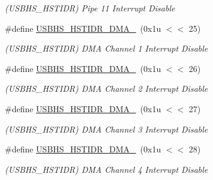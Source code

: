 \begin{DoxyCompactItemize}
\begin{DoxyCompactList}\small\item\em (U\+S\+B\+H\+S\+\_\+\+H\+S\+T\+I\+DR) Pipe 11 Interrupt Disable \end{DoxyCompactList}\item 
\mbox{\label{group__SAMV71__USBHS_ga093461bf7b81f1b606d9362880f396f1}} 
\#define \mbox{\hyperlink{group__SAMV71__USBHS_ga093461bf7b81f1b606d9362880f396f1}{U\+S\+B\+H\+S\+\_\+\+H\+S\+T\+I\+D\+R\+\_\+\+D\+M\+A\+\_}}~(0x1u $<$$<$ 25)
\begin{DoxyCompactList}\small\item\em (U\+S\+B\+H\+S\+\_\+\+H\+S\+T\+I\+DR) D\+MA Channel 1 Interrupt Disable \end{DoxyCompactList}\item 
\mbox{\label{group__SAMV71__USBHS_ga918da75c8395361aa6433e3f7f0d698d}} 
\#define \mbox{\hyperlink{group__SAMV71__USBHS_ga918da75c8395361aa6433e3f7f0d698d}{U\+S\+B\+H\+S\+\_\+\+H\+S\+T\+I\+D\+R\+\_\+\+D\+M\+A\+\_}}~(0x1u $<$$<$ 26)
\begin{DoxyCompactList}\small\item\em (U\+S\+B\+H\+S\+\_\+\+H\+S\+T\+I\+DR) D\+MA Channel 2 Interrupt Disable \end{DoxyCompactList}\item 
\mbox{\label{group__SAMV71__USBHS_gac7209c9ffead11cc6099d64f2f2c902f}} 
\#define \mbox{\hyperlink{group__SAMV71__USBHS_gac7209c9ffead11cc6099d64f2f2c902f}{U\+S\+B\+H\+S\+\_\+\+H\+S\+T\+I\+D\+R\+\_\+\+D\+M\+A\+\_}}~(0x1u $<$$<$ 27)
\begin{DoxyCompactList}\small\item\em (U\+S\+B\+H\+S\+\_\+\+H\+S\+T\+I\+DR) D\+MA Channel 3 Interrupt Disable \end{DoxyCompactList}\item 
\mbox{\label{group__SAMV71__USBHS_ga2241db1c6d32aad6273c7ff2d74cb1bb}} 
\#define \mbox{\hyperlink{group__SAMV71__USBHS_ga2241db1c6d32aad6273c7ff2d74cb1bb}{U\+S\+B\+H\+S\+\_\+\+H\+S\+T\+I\+D\+R\+\_\+\+D\+M\+A\+\_}}~(0x1u $<$$<$ 28)
\begin{DoxyCompactList}\small\item\em (U\+S\+B\+H\+S\+\_\+\+H\+S\+T\+I\+DR) D\+MA Channel 4 Interrupt Disable \end{DoxyCompactList}\item 

\end{DoxyCompactItemize}
